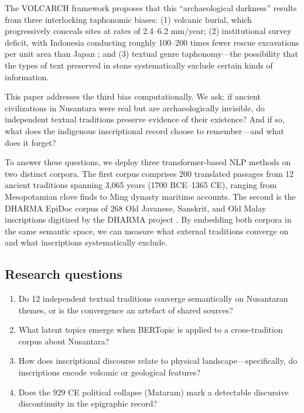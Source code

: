 \documentclass[12pt]{article}
\begin{document}
The VOLCARCH framework \citep[submitted]{Amien2026a} proposes that this ``archaeological darkness'' results from three interlocking taphonomic biases: (1) volcanic burial, which progressively conceals sites at rates of 2.4--6.2 mm/year; (2) institutional survey deficit, with Indonesia conducting roughly 100--200 times fewer rescue excavations per unit area than Japan \citep[submitted]{Amien2026a}; and (3) textual genre taphonomy---the possibility that the types of text preserved in stone systematically exclude certain kinds of information.

This paper addresses the third bias computationally.
We ask: if ancient civilizations in Nusantara were real but are archaeologically invisible, do independent textual traditions preserve evidence of their existence?
And if so, what does the indigenous inscriptional record choose to remember---and what does it forget?

To answer these questions, we deploy three transformer-based NLP methods on two distinct corpora.
The first corpus comprises 200 translated passages from 12 ancient traditions spanning 3,065 years (1700 BCE--1365 CE), ranging from Mesopotamian clove finds to Ming dynasty maritime accounts.
The second is the DHARMA EpiDoc corpus of 268 Old Javanese, Sanskrit, and Old Malay inscriptions digitized by the DHARMA project \citep{DHARMA2024}.
By embedding both corpora in the same semantic space, we can measure what external traditions converge on and what inscriptions systematically exclude.

\subsection{Research questions}

\begin{enumerate}
    \item Do 12 independent textual traditions converge semantically on Nusantaran themes, or is the convergence an artefact of shared sources?
    \item What latent topics emerge when BERTopic is applied to a cross-tradition corpus about Nusantara?
    \item How does inscriptional discourse relate to physical landscape---specifically, do inscriptions encode volcanic or geological features?
    \item Does the 929 CE political collapse (Mataram) mark a detectable discursive discontinuity in the epigraphic record?
\end{enumerate}
\end{document}
